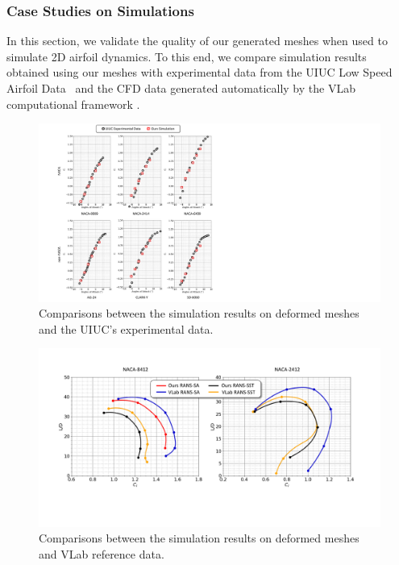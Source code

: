 \subsubsection{Case Studies on Simulations}
\label{ch3:sec:simulation}

In this section, we validate the quality of our generated meshes when used to simulate 2D airfoil dynamics. To this end, we compare simulation results obtained using our meshes with experimental data from the UIUC Low Speed Airfoil Data~\cite{aa.Selig1995,aa.Selig1996b,aa.Lyon1998, aa.Williamson2012} and the CFD data generated automatically by the VLab computational framework \cite{aa.Chappin2010,aa.Viola2018}.

\begin{figure}[!htb]
	\begin{center}
		\includegraphics[width=1\linewidth]{chapter3/tex/figures/experiment/simulation_UIUC.pdf}
	\end{center}
	\caption{
		\small Comparisons between the simulation results on deformed meshes and the UIUC's experimental data.
	}
	\label{ch3:fig:exp_simulation_UIUC}
\end{figure}

\begin{figure}[htb]
	\begin{center}
		\includegraphics[width=1\linewidth]{chapter3/tex/figures/experiment/simulation_supaero.pdf}
	\end{center}
	\caption{
		\small Comparisons between the simulation results on deformed meshes and VLab reference data.
	}
	\label{ch3:fig:exp_simulation_supaero}
\end{figure}

